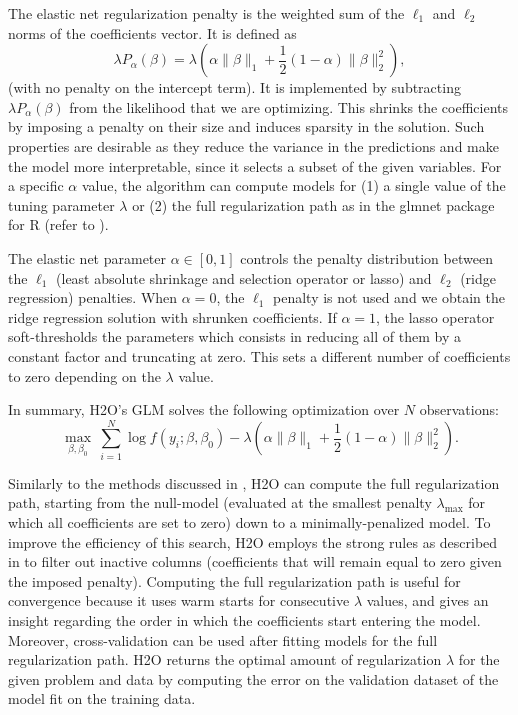The elastic net regularization penalty is the weighted sum of the $\ell_1$ and $\ell_2$ norms of the coefficients vector. It is defined as $$\lambda P_{\alpha}(\beta) = \lambda \left(\alpha \| \beta \|_1 + \frac{1}{2} (1- \alpha) \| \beta \|_2^2 \right),$$  (with no penalty on the intercept term). It is implemented by subtracting $\lambda P_{\alpha}(\beta)$ from the likelihood that we are optimizing. This shrinks the coefficients by imposing a penalty on their size and induces sparsity in the solution. Such properties are desirable as they reduce the variance in the predictions and make the model more interpretable, since it selects a subset of the given variables. For a specific $\alpha$ value, the algorithm can compute models for (1) a single value of the tuning parameter $\lambda$ or (2) the full regularization path as in the glmnet package for R (refer to ).

The elastic net parameter $\alpha \in [0,1]$ controls the penalty distribution between the $\ell_1$ (least absolute shrinkage and selection operator or lasso) and $\ell_2$ (ridge regression)
penalties. When $\alpha=0$, the $\ell_1$ penalty is not used and we obtain the
ridge regression solution with shrunken coefficients. If $\alpha=1$, the lasso operator soft-thresholds the parameters which consists in reducing all of them by a constant factor and truncating at zero. This sets a different number of coefficients to zero depending on the $\lambda$ value.
 
 In summary, H2O's GLM  solves the following optimization over $N$ observations:
$$ \max_{\beta,\beta_0}  \  \sum_{i=1}^N \log f\left(y_i ; \beta,\beta_0\right)  - \lambda \left(\alpha \| \beta \|_1 +  \frac{1}{2} (1- \alpha)\| \beta \|_2^2 \right). $$




Similarly to the methods discussed in , H2O can compute the full regularization path, starting
from the null-model (evaluated at the smallest penalty $\lambda_{\max}$ for which all coefficients are set to zero) down to a minimally-penalized model. To improve the efficiency of this search, 
H2O employs the strong rules as described in  to filter out inactive columns (coefficients that will remain equal to zero given the imposed penalty). Computing the full regularization path is useful for convergence because it uses warm starts for consecutive $\lambda$ values, and gives an insight regarding the order in which the coefficients start entering the model. Moreover, cross-validation can be used after fitting models for the full regularization path. H2O returns the optimal amount of regularization $\lambda$ for the given problem and data by computing the error on the validation dataset of the model fit on the training data.


